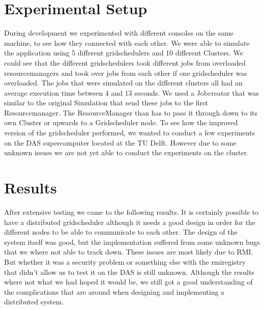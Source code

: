 \documentclass[twocolumn,a4paper]{article}
\begin{document}
\section{Experimental Setup}
During development we experimented with different consoles on the same machine, to see how they connected with each other. We were able to simulate the application using 5 different gridschedulers and 10 different Clusters. We could see that the different gridschedulers took different jobs from overloaded resourcemanagers and took over jobs from each other if one gridscheduler was overloaded. The jobs that were simulated on the different clusters all had an average execution time between 4 and 13 seconds. We used a Jobcreator that was similar to the original Simulation that send these jobs to the first Resourcemanager. The ResourceManager than has to pass it through down to its own Cluster or upwards to a Gridscheduler node. 
To see how the improved version of the gridscheduler performed, we wanted to conduct a few experiments on the DAS supercomputer located at the TU Delft. However due to some unknown issues we are not yet able to conduct the experiments on the cluster. 

\section{Results}
After extensive testing we came to the following results. It is certainly possible to have a distributed gridscheduler although it needs a good design in order for the different nodes to be able to communicate to each other. The design of the system itself was good, but the implementation suffered from some unknown bugs that we where not able to track down. These issues are most likely due to RMI. But whether it was a security problem or something else with the rmiregistry that didn't allow us to test it on the DAS is still unknown. Although the results where not what we had hoped it would be, we still got a good understanding of the complications that are around when designing and implementing a distributed system.
\end{document}
